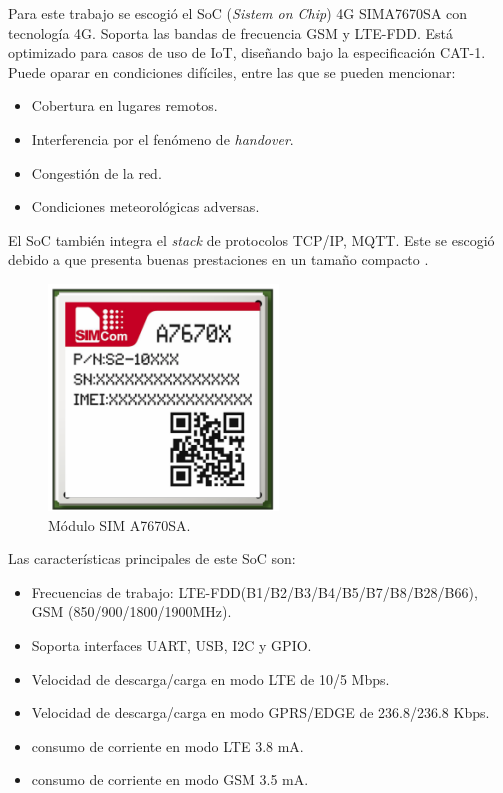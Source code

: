 Para este trabajo se escogió el SoC (\textit{Sistem on Chip}) 4G SIMA7670SA con tecnología 4G. Soporta las bandas de frecuencia GSM y LTE-FDD. Está optimizado para casos de uso de IoT, diseñando bajo la especificación CAT-1. Puede oparar en condiciones difíciles, entre las que se pueden mencionar:
\begin{itemize} 
    \item Cobertura en lugares remotos.
    \item Interferencia por el fenómeno de \textit{handover}.
    \item Congestión de la red.
    \item Condiciones meteorológicas adversas. 
\end{itemize}

El SoC también integra el \textit{stack} de protocolos TCP/IP, MQTT. Este se escogió debido a que presenta buenas prestaciones en un tamaño compacto \citep{A7670SA}. 

\vspace{1cm}

\begin{figure}[htbp]
	\centering
	\includegraphics[width=.5\textwidth]{./Figures/A7670SA.jpg}
	\caption{Módulo SIM A7670SA\protect\footnotemark.}
	\label{fig:A7670SA}
\end{figure}

Las características principales de este SoC son: 

\begin{itemize}
    \item Frecuencias de trabajo: LTE-FDD(B1/B2/B3/B4/B5/B7/B8/B28/B66), GSM (850/900/1800/1900MHz).
    \item Soporta interfaces UART, USB, I2C y GPIO.
    \item Velocidad de descarga/carga en modo LTE de 10/5 Mbps.
    \item Velocidad de descarga/carga en modo GPRS/EDGE de 236.8/236.8 Kbps.
    \item consumo de corriente en modo LTE 3.8 mA.
    \item consumo de corriente en modo GSM 3.5 mA.
\end{itemize}

